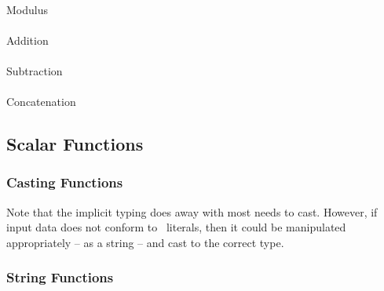 \paragraph{} Modulus
\paragraph{} Addition
\paragraph{} Subtraction

\paragraph{} Concatenation

\subsection{Scalar Functions}

\subsubsection{Casting Functions}

Note that the implicit typing does away with most needs to cast.
However, if input data does not conform to \stag\ literals, then it
could be manipulated appropriately -- as a string -- and cast to the
correct type.

\paragraph{}
\paragraph{}
\paragraph{}
\paragraph{}

\subsubsection{String Functions}

